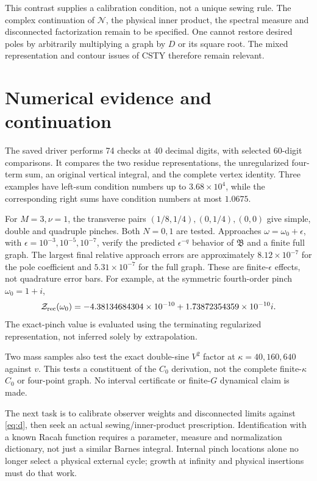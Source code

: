 \documentclass[11pt,a4paper]{article}
\newcommand{\B}{\mathfrak B}
\begin{document}
This contrast supplies a calibration condition, not a unique
sewing rule. The complex continuation of \(\mathcal N\), the
physical inner product, the spectral measure and disconnected
factorization remain to be specified. One cannot restore desired
poles by arbitrarily multiplying a graph by \(D\) or its square root.
The mixed representation and contour issues of CSTY \cite{csty}
therefore remain relevant.

\section{Numerical evidence and continuation}
The saved driver performs 74 checks at 40 decimal digits, with
selected 60-digit comparisons. It compares the two residue
representations, the unregularized four-term sum, an original
vertical integral, and the complete vertex identity.
Three examples have left-sum condition numbers up to
\(3.68\times10^4\), while the corresponding right sums have
condition numbers at most \(1.0675\).

For \(M=3,\nu=1\), the transverse pairs
\((1/8,1/4),(0,1/4),(0,0)\) give simple, double and quadruple
pinches. Both \(N=0,1\) are tested.
Approaches \(\omega=\omega_0+\epsilon\), with
\(\epsilon=10^{-3},10^{-5},10^{-7}\), verify the predicted
\(\epsilon^{-q}\) behavior of \(\B\) and a finite full graph.
The largest final relative approach errors are approximately
\(8.12\times10^{-7}\) for the pole coefficient and
\(5.31\times10^{-7}\) for the full graph.
These are finite-\(\epsilon\) effects, not quadrature error bars.
For example, at the symmetric fourth-order pinch \(\omega_0=1+i\),
\[
\mathcal Z_{\rm rec}(\omega_0)=
-4.38134684304\times10^{-10}
+1.73872354359\times10^{-10}i .
\]
The exact-pinch value is evaluated using the terminating
regularized representation, not inferred solely by extrapolation.

Two mass samples also test the exact double-sine \(V^2\)
factor at \(\kappa=40,160,640\) against \(v\).
This tests a constituent of the \(C_0\) derivation, not the
complete finite-\(\kappa\) \(C_0\) or four-point graph.
No interval certificate or finite-\(G\) dynamical claim is made.

The next task is to calibrate observer weights and disconnected
limits against \eqref{eq:d}, then seek an actual sewing/inner-product
prescription. Identification with a known Racah function requires
a parameter, measure and normalization dictionary, not just a
similar Barnes integral. Internal pinch locations alone no longer
select a physical external cycle; growth at infinity and physical
insertions must do that work.
\end{document}
